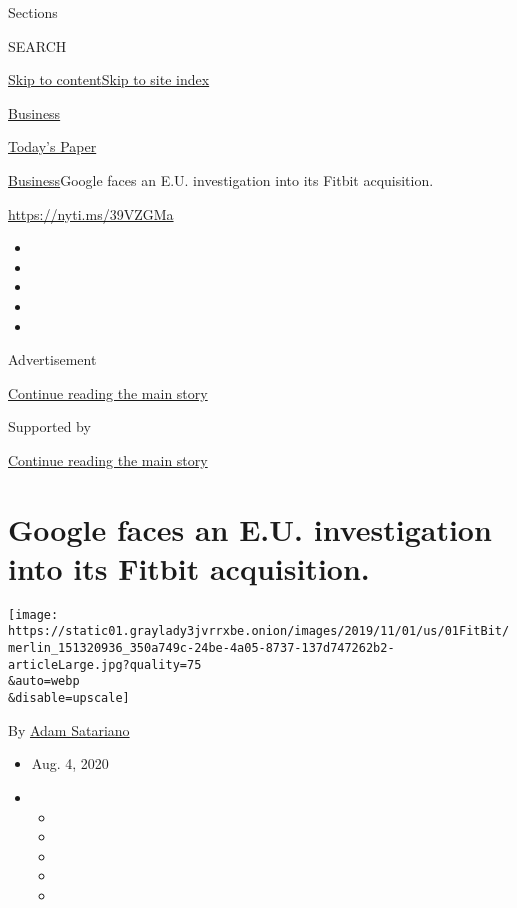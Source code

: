 Sections

SEARCH

\protect\hyperlink{site-content}{Skip to
content}\protect\hyperlink{site-index}{Skip to site index}

\href{https://www.nytimes3xbfgragh.onion/section/business}{Business}

\href{https://myaccount.nytimes3xbfgragh.onion/auth/login?response_type=cookie\&client_id=vi}{}

\href{https://www.nytimes3xbfgragh.onion/section/todayspaper}{Today's
Paper}

\href{/section/business}{Business}\textbar{}Google faces an E.U.
investigation into its Fitbit acquisition.

\url{https://nyti.ms/39VZGMa}

\begin{itemize}
\item
\item
\item
\item
\item
\end{itemize}

Advertisement

\protect\hyperlink{after-top}{Continue reading the main story}

Supported by

\protect\hyperlink{after-sponsor}{Continue reading the main story}

\hypertarget{google-faces-an-eu-investigation-into-its-fitbit-acquisition}{%
\section{Google faces an E.U. investigation into its Fitbit
acquisition.}\label{google-faces-an-eu-investigation-into-its-fitbit-acquisition}}

\texttt{[image: https://static01.graylady3jvrrxbe.onion/images/2019/11/01/us/01FitBit/merlin\_151320936\_350a749c-24be-4a05-8737-137d747262b2-articleLarge.jpg?quality=75\\\&auto=webp\\\&disable=upscale]}

By \href{https://www.nytimes3xbfgragh.onion/by/adam-satariano}{Adam
Satariano}

\begin{itemize}
\item
  Aug. 4, 2020
\item
  \begin{itemize}
  \item
  \item
  \item
  \item
  \item
  \end{itemize}
\end{itemize}

